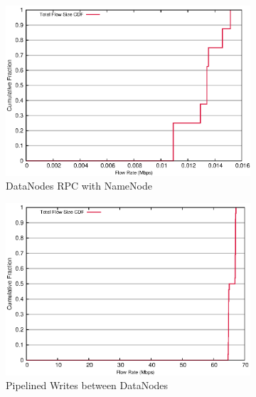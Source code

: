 \begin{figure}[!ht]
\label{fig:replica_size}
\centering
  \begin{subfigure}[b]{.45\linewidth}
   \centering
	\includegraphics[width=.99\textwidth]{figures/replica_change/24_28_flow_size.eps} 
	\caption{DataNodes RPC with NameNode}\label{fig:replica_size:rpc}
   \end{subfigure}%
  \begin{subfigure}[b]{.45\linewidth}
   \centering
	\includegraphics[width=.99\textwidth]{figures/replica_change/36_32_flow_size.eps} 
	\caption{Pipelined Writes between DataNodes}\label{fig:replica_size:pipe_write}
   \end{subfigure} \\%
  \begin{subfigure}[b]{.75\linewidth}
   \centering

\end{subfigure}
\end{figure}

